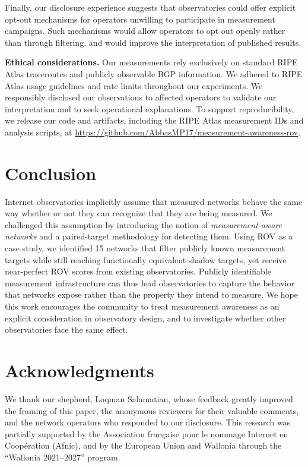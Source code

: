\documentclass[sigconf, 10pt]{acmart}
\begin{document}
Finally, our disclosure experience suggests that observatories could offer explicit opt-out mechanisms for operators unwilling to participate in measurement campaigns. Such mechanisms would allow operators to opt out openly rather than through filtering, and would improve the interpretation of published results.

\noindent\textbf{Ethical considerations.}
Our measurements rely exclusively on standard RIPE Atlas traceroutes and publicly observable BGP information. We adhered to RIPE Atlas usage guidelines and rate limits throughout our experiments. We responsibly disclosed our observations to affected operators to validate our interpretation and to seek operational explanations. To support reproducibility, we release our code and artifacts, including the RIPE Atlas measurement IDs and analysis scripts, at  \url{https://github.com/AbbasMP17/measurement-awareness-rov}.
\section{Conclusion}

Internet observatories implicitly assume that measured networks behave the same way whether or not they can recognize that they are being measured. We challenged this assumption by introducing the notion of \emph{measurement-aware networks} and a paired-target methodology for detecting them. Using ROV as a case study, we identified 15 networks that filter publicly known measurement targets while still reaching functionally equivalent shadow targets, yet receive near-perfect ROV scores from existing observatories. Publicly identifiable measurement infrastructure can thus lead observatories to capture the behavior that networks expose rather than the property they intend to measure. We hope this work encourages the community to treat measurement awareness as an explicit consideration in observatory design, and to investigate whether other observatories face the same effect.

\section{Acknowledgments}

We thank our shepherd, Loqman Salamatian, whose feedback greatly improved the framing of this paper, the anonymous reviewers for their valuable comments, and the network operators who responded to our disclosure. This research was partially supported by the Association fran\c{c}aise pour le nommage Internet en Coop\'eration (Afnic), and by the European Union and Wallonia through the ``Wallonia 2021--2027'' program.



\end{document}
